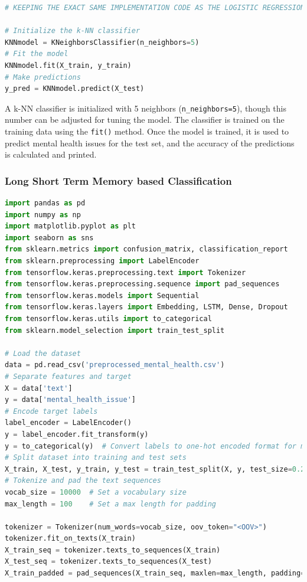 \begin{tcolorbox}[colback=gray!5!white, colframe=gray!80!black, boxrule=0.5pt, title=k-NN Classifier Implementation for Mental Health Classification]
    \begin{lstlisting}[language=Python]
# KEEPING THE EXACT SAME IMPLEMENTATION CODE AS THE LOGISTIC REGRESSION 

# Initialize the k-NN classifier
KNNmodel = KNeighborsClassifier(n_neighbors=5)  
# Fit the model
KNNmodel.fit(X_train, y_train)
# Make predictions
y_pred = KNNmodel.predict(X_test)
\end{lstlisting}
\end{tcolorbox}

\noindent
 A k-NN classifier is initialized with 5 neighbors (\texttt{n\_neighbors=5}), though this number can be adjusted for tuning the model. The classifier is trained on the training data using the \texttt{fit()} method. Once the model is trained, it is used to predict mental health issues for the test set, and the accuracy of the predictions is calculated and printed. 


\subsubsection{Long Short Term Memory based Classification}

\begin{tcolorbox}[colback=gray!5!white, colframe=gray!80!black, boxrule=0.5pt, title=LSTM Model Implementation]
    \begin{lstlisting}[language=Python]
import pandas as pd
import numpy as np
import matplotlib.pyplot as plt
import seaborn as sns
from sklearn.metrics import confusion_matrix, classification_report
from sklearn.preprocessing import LabelEncoder
from tensorflow.keras.preprocessing.text import Tokenizer
from tensorflow.keras.preprocessing.sequence import pad_sequences
from tensorflow.keras.models import Sequential
from tensorflow.keras.layers import Embedding, LSTM, Dense, Dropout
from tensorflow.keras.utils import to_categorical
from sklearn.model_selection import train_test_split

# Load the dataset
data = pd.read_csv('preprocessed_mental_health.csv')
# Separate features and target
X = data['text']
y = data['mental_health_issue']
# Encode target labels
label_encoder = LabelEncoder()
y = label_encoder.fit_transform(y)
y = to_categorical(y)  # Convert labels to one-hot encoded format for multi-class classification
# Split dataset into training and test sets
X_train, X_test, y_train, y_test = train_test_split(X, y, test_size=0.2, random_state=42)
# Tokenize and pad the text sequences
vocab_size = 10000  # Set a vocabulary size
max_length = 100    # Set a max length for padding

tokenizer = Tokenizer(num_words=vocab_size, oov_token="<OOV>")
tokenizer.fit_on_texts(X_train)
X_train_seq = tokenizer.texts_to_sequences(X_train)
X_test_seq = tokenizer.texts_to_sequences(X_test)
X_train_padded = pad_sequences(X_train_seq, maxlen=max_length, padding='post', truncating='post')
\end{lstlisting}
\end{tcolorbox}


